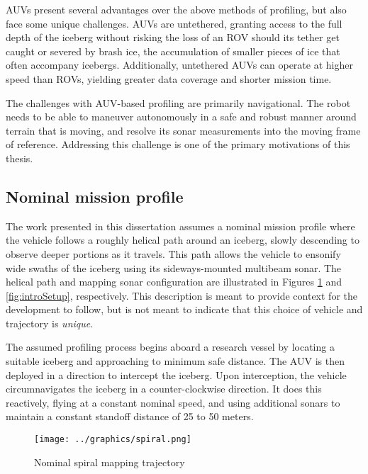 AUVs present several advantages over the above methods of profiling, but also face some unique challenges. AUVs are untethered, granting access to the full depth of the iceberg without risking the loss of an ROV should its tether get caught or severed by brash ice, the accumulation of smaller pieces of ice that often accompany icebergs. Additionally, untethered AUVs can operate at higher speed than ROVs, yielding greater data coverage and shorter mission  time. 

The challenges with AUV-based profiling are primarily navigational. The robot needs to be able to maneuver autonomously in a safe and robust manner around terrain that is moving, and resolve its sonar measurements into the moving frame of reference. Addressing this challenge is one of the primary motivations of this thesis.



\subsection{Nominal mission profile}
\label{sec.MissionProfileDef}
The work presented in this dissertation assumes a nominal mission profile where the vehicle follows a roughly helical path around an iceberg, slowly descending to observe deeper portions as it travels. This path allows the vehicle to ensonify wide swaths of the iceberg using its sideways-mounted multibeam sonar. The helical path and mapping sonar configuration are illustrated in Figures \ref{fig:NominalProfile1} and \ref{fig:introSetup}, respectively. This description is meant to provide context for the development to follow, but is not meant to indicate that this choice of vehicle and trajectory is \emph{unique}.  

The assumed profiling process begins aboard a research vessel by locating a suitable iceberg and approaching to minimum safe distance. The AUV is then deployed in a direction to intercept the iceberg. Upon interception, the vehicle circumnavigates the iceberg in a counter-clockwise direction. It does this reactively, flying at a constant nominal speed, and using additional sonars to maintain a constant standoff distance of 25 to 50 meters.

\begin{figure}[htb]
   \centering
   \texttt{[image: ../graphics/spiral.png]} %
   \caption{Nominal spiral mapping trajectory }
   \label{fig:NominalProfile1}
\end{figure}


